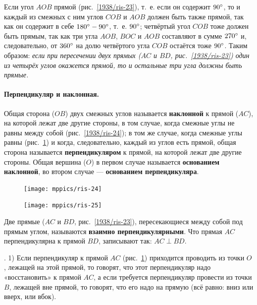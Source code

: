 \documentclass[oneside]{book}
\begin{document}
Если угол $AOB$ прямой (рис.~\ref{1938/ris-23}), т.~е. если он содержит $90\degree$, то и каждый из смежных с ним углов $COB$ и $AOB$ должен быть также прямой, так как он содержит в себе $180\degree-90\degree$, т.~е. $90\degree$;
четвёртый угол $COB$ тоже должен быть прямым, так как три угла $AOB$, $BOC$ и $AOB$ составляют в сумме $270\degree$ и, следовательно, от $360\degree$ на долю четвёртого угла $COB$ остаётся тоже $90\degree$.
Таким образом:
\emph{если при пересечении двух прямых \emph{($AC$ и $BD$, рис.~\ref{1938/ris-23})} один из четырёх углов окажется прямой, то и остальные три угла должны быть прямые.}

\paragraph{Перпендикуляр и наклонная.}\label{1938/23}
Общая сторона ($OB$) двух смежных углов называется \textbf{наклонной} к прямой ($AC$), на которой лежат две другие стороны, в том случае, когда смежные углы не равны между собой (рис.~\ref{1938/ris-24});
в том же случае, когда смежные углы равны (рис.~\ref{1938/ris-25}) и когда, следовательно, каждый из углов есть прямой, общая сторона называется \textbf{перпендикуляром} к прямой, на которой лежат две другие стороны.
Общая вершина ($O$) в первом случае называется \textbf{основанием наклонной}, во втором случае — \textbf{основанием перпендикуляра}.

\begin{figure}
\begin{minipage}{.48\textwidth}
\centering
\texttt{[image: mppics/ris-24]}
\caption{}\label{1938/ris-24}
\end{minipage}\hfill
\begin{minipage}{.48\textwidth}
\centering
\texttt{[image: mppics/ris-25]}
\caption{}\label{1938/ris-25}
\end{minipage}
\end{figure}

Две прямые ($AC$ и $BD$, рис.~\ref{1938/ris-23}), пересекающиеся между собой под прямым углом, называются \textbf{взаимно перпендикулярными}.
Что прямая $AC$ перпендикулярна к прямой $BD$, записывают так: $AC\perp BD$.

.
1) Если перпендикуляр к прямой $AC$ (рис.~\ref{1938/ris-25}) приходится проводить из точки $O$, лежащей на этой прямой, то говорят, что этот перпендикуляр надо «восстановить» к прямой $AC$, а если требуется перпендикуляр провести из точки $B$, лежащей вне прямой, то говорят, что его надо  на прямую (всё равно:
вниз или вверх, или вбок).
\end{document}
